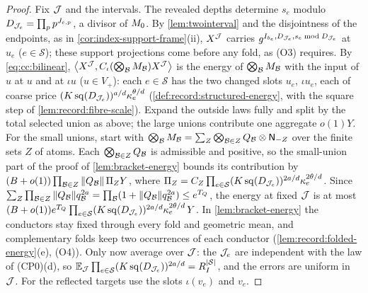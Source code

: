 \begin{proof}
Fix $\mathcal J$ and the intervals. The revealed depths determine $s_e$
modulo $D_{\mathcal J_e}=\prod_p p^{J_{e,p}}$, a divisor of $M_0$. By
\cref{lem:twointerval} and the disjointness of the endpoints, as in
\cref{cor:index-support-frame}(ii), $X^\mathcal J$ carries
$g^{I_{b_e},D_{\mathcal J_e},s_e\bmod D_{\mathcal J_e}}$ at $u_e$ ($e\in\mathcal S$); these support
projections come before any fold, as (O3) requires. By
\eqref{eq:cc:bilinear}, $\left\langle X^\mathcal J,C_\iota(\bigotimes_\mathcal B M_\mathcal B)X^\mathcal J\right\rangle$ is the
energy of $\bigotimes_\mathcal B M_\mathcal B$ with the input of $u$ at $u$ and at $\iota u$
($u\in V_+$): each $e\in\mathcal S$ has the two changed slots $u_e$, $\iota u_e$,
each of coarse price $(K\operatorname{sq}(D_{\mathcal J_e}))^{a/d}\kappa_e^{\theta/d}$
(\cref{def:record:structured-energy}, with the square step of
\cref{lem:record:fibre-scale}).
Expand the outside laws fully and split by the total selected union
as above; the large unions contribute one aggregate $o(1)Y$.
For the small unions, start with
$\bigotimes_\mathcal B M_\mathcal B=\sum_Z\bigotimes_{\mathcal B\in Z}Q_\mathcal B\otimes\mathsf N_{-Z}$ over the
finite sets $Z$ of atoms. Each $\bigotimes_{\mathcal B\in Z}Q_\mathcal B$ is admissible and
positive, so the small-union part of the proof of \cref{lem:bracket-energy}
bounds its contribution by
$(B+o(1))\prod_{\mathcal B\in Z}\|Q_\mathcal B\|\,\Pi_ZY$, where
$\Pi_Z=C_Z\prod_{e\in\mathcal S}(K\operatorname{sq}(D_{\mathcal J_e}))^{2a/d}\kappa_e^{2\theta/d}$.
Since $\sum_Z\prod_{\mathcal B\in Z}\|Q_\mathcal B\|q_\mathcal B^{2a}=\prod_\mathcal B(1+\|Q_\mathcal B\|q_\mathcal B^{2a})
\le e^{T_Q}$, the energy at fixed $\mathcal J$ is at most
$(B+o(1))e^{T_Q}\prod_{e\in\mathcal S}(K\operatorname{sq}(D_{\mathcal J_e}))^{2a/d}
\kappa_e^{2\theta/d}\,Y$. In \cref{lem:bracket-energy} the conductors stay
fixed through every fold and geometric mean, and complementary folds keep
two occurrences of each conductor (\cref{lem:record:folded-energy}(e), (O4)).
Only now average over $\mathcal J$: the $\mathcal J_e$ are independent with the law of
(CP0)(d), so $\mathbb E_\mathcal J\prod_{e\in\mathcal S}(K\operatorname{sq}(D_{\mathcal J_e}))^{2a/d}
=R_I^{|\mathcal S|}$, and the errors are uniform in $\mathcal J$. For the reflected
targets use the slots $\iota(v_e)$ and $v_e$.
\end{proof}

